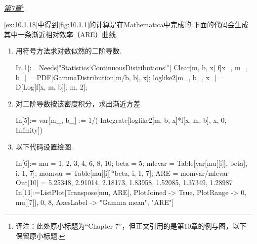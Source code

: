 \medskip\noindent\textit{\hyperref[sec:7]{第7章}}\footnote{译注：此处原小标题为“Chapter 7”，但正文引用的是第10章的例与图，以下保留原小标题.}
\begin{example}[伽马均值的渐近相对效率]\label{ex:12.6.7}
\autoref{ex:10.1.18}中得到\autoref{fig:10.1.1}的计算是在Mathematica中完成的.下面的代码会生成其中一条渐近相对效率（ARE）曲线.
\begin{enumerate}[label=(\arabic*)]
\item 用符号方法求对数似然的二阶导数.
\begin{sourcecode}
In[1]:= Needs["Statistics`ContinuousDistributions`"]
Clear[m, b, x]
f[x_, m_, b_] = PDF[GammaDistribution[m/b, b], x];
loglike2[m_, b_, x_] = D[Log[f[x, m, b]], {m, 2}];
\end{sourcecode}
\item 对二阶导数按该密度积分，求出渐近方差.
\begin{sourcecode}
In[5]:= var[m_, b_] := 1/(-Integrate[loglike2[m, b, x]*f[x, m, b],
 {x, 0, Infinity}])
\end{sourcecode}
\item 以下代码设置绘图.
\begin{sourcecode}
In[6]:=
mu = {1, 2, 3, 4, 6, 8, 10};
beta = 5;
mlevar = Table[var[mu[[i]], beta], {i, 1, 7}];
momvar = Table[mu[[i]]*beta, {i, 1, 7}];
ARE = momvar/mlevar
Out[10] = {5.25348, 2.91014, 2.18173, 1.83958, 1.52085, 1.37349, 1.28987}
In[11]:=ListPlot[Transpose[{mu, ARE}], PlotJoined -> True,
 PlotRange -> {{0, mu[[7]]}, {0, 8}}, AxesLabel -> {"Gamma mean",
 "ARE"}]
\end{sourcecode}
\end{enumerate}
\end{example}


